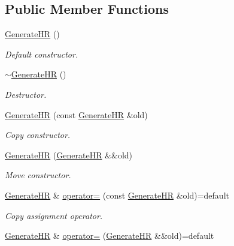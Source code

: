 \subsection*{Public Member Functions}
\begin{DoxyCompactItemize}
\item 
\mbox{\label{classvarfiles_1_1_generate_h_r_a725681154d343d3612b7f6b2e98f5998}} 
\hyperlink{classvarfiles_1_1_generate_h_r_a725681154d343d3612b7f6b2e98f5998}{Generate\+HR} ()
\begin{DoxyCompactList}\small\item\em Default constructor. \end{DoxyCompactList}\item 
\mbox{\label{classvarfiles_1_1_generate_h_r_ab17f852d822f61c832ac5409dff5c661}} 
\hyperlink{classvarfiles_1_1_generate_h_r_ab17f852d822f61c832ac5409dff5c661}{$\sim$\+Generate\+HR} ()
\begin{DoxyCompactList}\small\item\em Destructor. \end{DoxyCompactList}\item 
\hyperlink{classvarfiles_1_1_generate_h_r_af6739babad28f72258c4e10fe937aa23}{Generate\+HR} (const \hyperlink{classvarfiles_1_1_generate_h_r}{Generate\+HR} \&old)
\begin{DoxyCompactList}\small\item\em Copy constructor. \end{DoxyCompactList}\item 
\hyperlink{classvarfiles_1_1_generate_h_r_a7d7d7cd9e96e348c63f4f59b1bcbcc4d}{Generate\+HR} (\hyperlink{classvarfiles_1_1_generate_h_r}{Generate\+HR} \&\&old)
\begin{DoxyCompactList}\small\item\em Move constructor. \end{DoxyCompactList}\item 
\hyperlink{classvarfiles_1_1_generate_h_r}{Generate\+HR} \& \hyperlink{classvarfiles_1_1_generate_h_r_a065b4553f2dcc37d8a123725200ef5c7}{operator=} (const \hyperlink{classvarfiles_1_1_generate_h_r}{Generate\+HR} \&old)=default
\begin{DoxyCompactList}\small\item\em Copy assignment operator. \end{DoxyCompactList}\item 
\hyperlink{classvarfiles_1_1_generate_h_r}{Generate\+HR} \& \hyperlink{classvarfiles_1_1_generate_h_r_a0478ceb0f776cbdeb4fa9c2f66e70002}{operator=} (\hyperlink{classvarfiles_1_1_generate_h_r}{Generate\+HR} \&\&old)=default

\end{DoxyCompactItemize}
